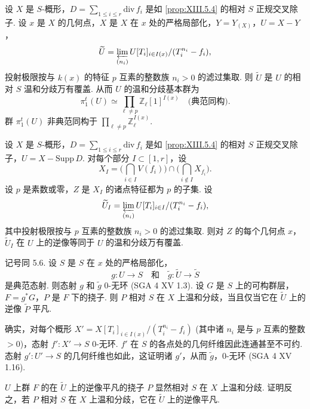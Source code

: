 \begin{corollary}\label{cor:XIII.5.6}
设 $X$ 是 $S$-概形，$D = \sum_{1 \leqslant i \leqslant r} \mathrm{div}\, f_i$ 是如 \ref{prop:XIII.5.4} 的相对 $S$ 正规交叉除子. 设 $x$ 是 $X$ 的几何点，$X$ 是 $X$ 在 $x$ 处的严格局部化，$Y = Y_{(X)}$，$U = X - Y$，
\[
\widetilde{U} = \varprojlim_{(n_i)} U[T_i]_{i \in I(x)}/(T_i^{n_i} - f_i),
\]
投射极限按与 $k(x)$ 的特征 $p$ 互素的整数族 $n_i > 0$ 的滤过集取. 则 $\widetilde{U}$ 是 $U$ 的相对 $S$ 温和分歧万有覆盖. 从而 $U$ 的温和分歧基本群为
\[
\pi^t_1(U) \simeq \prod_{\ell \neq p} \mathbb{Z}_\ell[1]^{I(x)} \quad \text{(典范同构)}.
\]
群 $\pi^t_1(U)$ 非典范同构于 $\prod_{\ell \neq p} \mathbb{Z}_\ell^{I(x)}$.
\end{corollary}

\begin{remark}\label{rem:XIII.5.6.1}
设 $X$ 是 $S$-概形，$D = \sum_{1 \leqslant i \leqslant r} \mathrm{div}\, f_i$ 是如 \ref{prop:XIII.5.4} 的相对 $S$ 正规交叉除子，$U = X - \mathrm{Supp}\, D$. 对每个部分 $I \subset [1, r]$，设
\[
X_I = \Big(\bigcap_{i \in I} V(f_i)\Big) \cap \Big(\bigcap_{i \notin I} X_{f_i}\Big).
\]
设 $p$ 是素数或零，$Z$ 是 $X_I$ 的诸点特征都为 $p$ 的子集. 设
\[
\widetilde{U}_I = \varprojlim_{(n_i)} U[T_i]_{i \in I}/(T_i^{n_i} - f_i),
\]
其中投射极限按与 $p$ 互素的整数族 $n_i > 0$ 的滤过集取. 则对 $Z$ 的每个几何点 $x$，$\widetilde{U}_I$ 在 $U$ 上的逆像等同于 $U$ 的温和分歧万有覆盖.
\end{remark}

\begin{corollary}\label{cor:XIII.5.7}
记号同 5.6. 设 $S$ 是 $S$ 在 $x$ 处的严格局部化，
\[
g \colon U \longrightarrow S \quad \text{和} \quad \widetilde{g} \colon \widetilde{U} \longrightarrow \widetilde{S}
\]
是典范态射. 则态射 $g$ 和 $\widetilde{g}$ 0-无环 (SGA 4 XV 1.3). 设 $G$ 是 $S$ 上的可构群层，$F = g^{*} G$，$P$ 是 $F$ 下的挠子. 则 $P$ 相对 $S$ 在 $X$ 上温和分歧，当且仅当它在 $\widetilde{U}$ 上的逆像 $\widetilde{P}$ 平凡.
\end{corollary}

确实，对每个概形 $X' = X[T_i]_{i \in I(x)}/(T_i^{n_i} - f_i)$ (其中诸 $n_i$ 是与 $p$ 互素的整数 $> 0$)，态射 $f' \colon X' \to S$ 0-无环. $f'$ 在 $S$ 的各点处的几何纤维因此连通甚至不可约. 态射 $g' \colon U' \to S$ 的几何纤维也如此，这证明诸 $g'$，从而 $\widetilde{g}$，0-无环 (SGA 4 XV 1.16).

$U$ 上群 $F$ 的在 $\widetilde{U}$ 上的逆像平凡的挠子 $P$ 显然相对 $S$ 在 $X$ 上温和分歧. 证明反之，若 $P$ 相对 $S$ 在 $X$ 上温和分歧，它在 $\widetilde{U}$ 上的逆像平凡.

